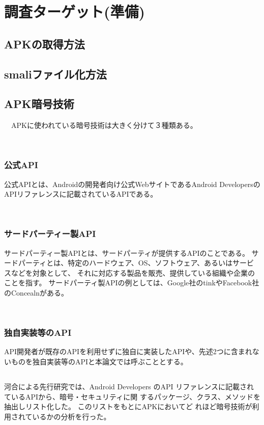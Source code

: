 \newpage
\section{調査ターゲット(準備)}
\subsection {APKの取得方法}
\subsection{smaliファイル化方法}

\subsection{APK暗号技術}
　APKに使われている暗号技術は大きく分けて３種類ある。

　\subsubsection {公式API}
公式APIとは、Androidの開発者向け公式WebサイトであるAndroid DevelopersのAPIリファレンスに記載されているAPIである。

　\subsubsection {サードパーティー製API}
サードパーティー製APIとは、サードパーティが提供するAPIのことである。
サードパーティとは、特定のハードウェア、OS、ソフトウェア、あるいはサービスなどを対象として、
それに対応する製品を販売、提供している組織や企業のことを指す。
サードパーティ製APIの例としては、Google社のtinkやFacebook社のConcealnがある。

　\subsubsection {独自実装等のAPI}
API開発者が既存のAPIを利用せずに独自に実装したAPIや、先述2つに含まれないものを独自実装等のAPIと本論文では呼ぶこととする。

\subsection{   }
河合による先行研究では、Android Developers のAPI リファレンスに記載されているAPIから、暗号・セキュリティに関
するパッケージ、クラス、メソッドを抽出しリスト化した。
このリストをもとにAPKにおいてど
れほど暗号技術が利用されているかの分析を行った。

